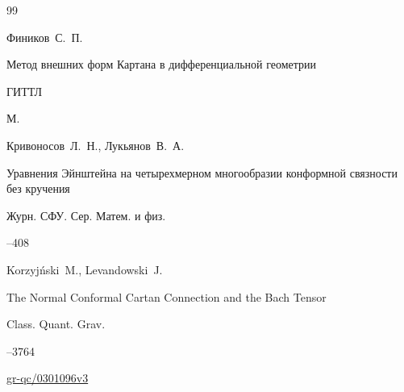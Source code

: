 \begin{thebibliography}{99}








\by Фиников~С.~П.

\book Метод внешних форм Картана в дифференциальной геометрии


\publ ГИТТЛ

\publaddr М.













\by Кривоносов~Л.~Н., Лукьянов~В.~А.

\paper Уравнения Эйнштейна на четырехмерном многообразии конформной связности без кручения

\jour Журн. СФУ. Сер. Матем. и физ.




--408







\by  Korzyj\'nski~M., Levandowski~J.

\paper The Normal Conformal Cartan Connection and the Bach Tensor

\jour Class. Quant. Grav.



--3764


\arxiv \href{https://arxiv.org/abs/gr-qc/0301096}{gr-qc/0301096v3}




\end{thebibliography}





